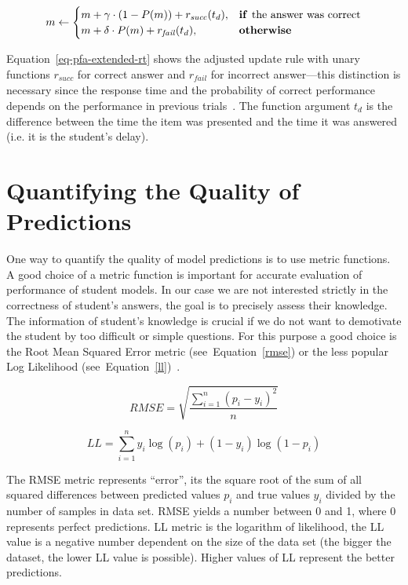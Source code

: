 \begin{equation} \label{eq-pfa-extended-rt}
  m \gets \begin{cases}
            m + \gamma \cdot (1 - P(m)) + r_{\mathit{succ}}(t_d), & \text{\textbf{if }} \text{the answer was correct} \\
            m + \delta \cdot P(m) + r_{\mathit{fail}}(t_d), & \text{\textbf{otherwise}}
          \end{cases}
\end{equation}

Equation~\ref{eq-pfa-extended-rt} shows the adjusted update rule with unary functions $r_{\mathit{succ}}$ for correct answer and $r_{\mathit{fail}}$ for incorrect answer---this distinction is necessary since the response time and the probability of correct performance depends on the performance in previous trials~\cite{papouvsekanalysis}. The function argument $t_d$ is the difference between the time the item was presented and the time it was answered (i.e. it is the student's delay).

\section{Quantifying the Quality of Predictions}
\label{metrics}

One way to quantify the quality of model predictions is to use metric functions. A good choice of a metric function is important for accurate evaluation of performance of student models. In our case we are not interested strictly in the correctness of student's answers, the goal is to precisely assess their knowledge. The information of student's knowledge is crucial if we do not want to demotivate the student by too difficult or simple questions. For this purpose a good choice is the Root Mean Squared Error metric (see~Equation~\ref{rmse}) or the less popular Log Likelihood (see~Equation~\ref{ll})~\cite{Pelanek2015a}.

\begin{equation} \label{rmse}
  RMSE = \sqrt{\frac{\sum_{i=1}^n (p_i - y_i)^2}{n}}
\end{equation}

\begin{equation} \label{ll}
  LL = \sum_{i=1}^n y_i \log(p_i) + (1 - y_i) \log(1 - p_i)
\end{equation}

The RMSE metric represents ``error'', its the square root of the sum of all squared differences between predicted values $p_i$ and true values $y_i$ divided by the number of samples in data set. RMSE yields a number between 0 and 1, where 0 represents perfect predictions. LL metric is the logarithm of likelihood, the LL value is a negative number dependent on the size of the data set (the bigger the dataset, the lower LL value is possible). Higher values of LL represent the better predictions.

